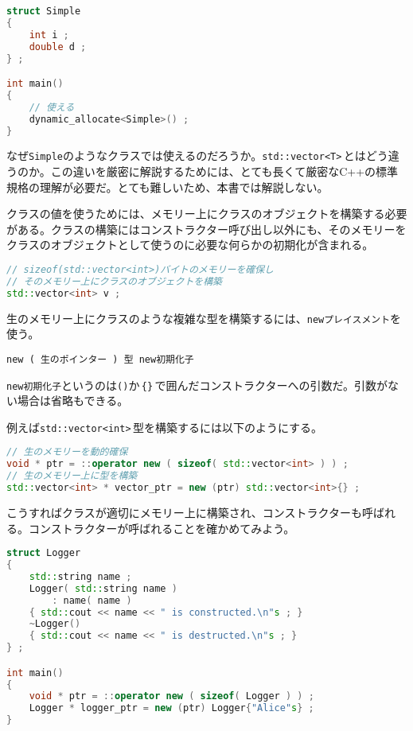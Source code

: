 \begin{lstlisting}[language={C++}]
struct Simple
{
    int i ;
    double d ;
} ;

int main()
{
    // 使える
    dynamic_allocate<Simple>() ;
}
\end{lstlisting}

なぜ\texttt{Simple}のようなクラスでは使えるのだろうか。\texttt{std::vector<T>}\,とはどう違うのか。この違いを厳密に解説するためには、とても長くて厳密なC++の標準規格の理解が必要だ。とても難しいため、本書では解説しない。

クラスの値を使うためには、メモリー上にクラスのオブジェクトを構築する必要がある。クラスの構築にはコンストラクター呼び出し以外にも、そのメモリーをクラスのオブジェクトとして使うのに必要な何らかの初期化が含まれる。

\begin{lstlisting}[language={C++}]
// sizeof(std::vector<int>)バイトのメモリーを確保し
// そのメモリー上にクラスのオブジェクトを構築
std::vector<int> v ;
\end{lstlisting}

生のメモリー上にクラスのような複雑な型を構築するには、\texttt{newプレイスメント}を使う。

\begin{lstlisting}[style=grammar]
new ( 生のポインター ) 型 new初期化子
\end{lstlisting}

\texttt{new初期化子}というのは\texttt{()}か\,\texttt{\{\}}\,で囲んだコンストラクターへの引数だ。引数がない場合は省略もできる。

例えば\texttt{std::vector<int>}\,型を構築するには以下のようにする。

\begin{lstlisting}[language={C++}]
// 生のメモリーを動的確保
void * ptr = ::operator new ( sizeof( std::vector<int> ) ) ;
// 生のメモリー上に型を構築
std::vector<int> * vector_ptr = new (ptr) std::vector<int>{} ;
\end{lstlisting}

こうすればクラスが適切にメモリー上に構築され、コンストラクターも呼ばれる。コンストラクターが呼ばれることを確かめてみよう。

\ifTombow\pagebreak\fi
\begin{lstlisting}[language={C++}]
struct Logger
{
    std::string name ;
    Logger( std::string name )
        : name( name )
    { std::cout << name << " is constructed.\n"s ; }
    ~Logger()
    { std::cout << name << " is destructed.\n"s ; }
} ;

int main()
{
    void * ptr = ::operator new ( sizeof( Logger ) ) ;
    Logger * logger_ptr = new (ptr) Logger{"Alice"s} ;
}
\end{lstlisting}

